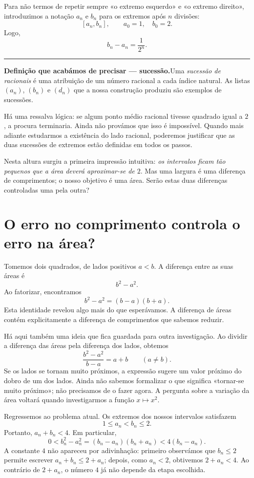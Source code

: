 \documentclass[11pt,a4paper]{article}
\newcommand{\assentado}[2]{%
\par\medskip\noindent\begingroup\color{azul}\rule{\linewidth}{0.45pt}\par\smallskip
\noindent\textbf{#1.}\enspace #2\par\endgroup\medskip}
\begin{document}
Para não termos de repetir sempre «o extremo esquerdo» e «o extremo direito», introduzimos a notação $a_n$ e $b_n$ para os extremos após $n$ divisões:
\[
[a_n,b_n],\qquad a_0=1,\quad b_0=2.
\]
Logo,
\[
\boxed{b_n-a_n=\frac1{2^n}.}
\]

\assentado{Definição que acabámos de precisar --- sucessão}{Uma \emph{sucessão de racionais} é uma atribuição de um número racional a cada índice natural. As listas $(a_n)$, $(b_n)$ e $(d_n)$ que a nossa construção produziu são exemplos de sucessões.}

Há uma ressalva lógica: se algum ponto médio racional tivesse quadrado igual a $2$, a procura terminaria. Ainda não provámos que isso é impossível. Quando mais adiante estudarmos a existência do lado racional, poderemos justificar que as duas sucessões de extremos estão definidas em todos os passos.

Nesta altura surgiu a primeira impressão intuitiva: \emph{os intervalos ficam tão pequenos que a área deverá aproximar-se de $2$}. Mas uma largura é uma diferença de comprimentos; o nosso objetivo é uma área. Serão estas duas diferenças controladas uma pela outra?

\section{O erro no comprimento controla o erro na área?}

Tomemos dois quadrados, de lados positivos $a<b$. A diferença entre as suas áreas é
\[
b^2-a^2.
\]
Ao fatorizar, encontramos
\[
\boxed{b^2-a^2=(b-a)(b+a).}
\]
Esta identidade revelou algo mais do que esperávamos. A diferença de áreas contém explicitamente a diferença de comprimentos que sabemos reduzir.

Há aqui também uma ideia que fica guardada para outra investigação. Ao dividir a diferença das áreas pela diferença dos lados, obtemos
\[
\frac{b^2-a^2}{b-a}=a+b\qquad(a\ne b).
\]
Se os lados se tornam muito próximos, a expressão sugere um valor próximo do dobro de um dos lados. Ainda não sabemos formalizar o que significa «tornar-se muito próximo»; não precisamos de o fazer agora. A pergunta sobre a variação da área voltará quando investigarmos a função $x\mapsto x^2$.

Regressemos ao problema atual. Os extremos dos nossos intervalos satisfazem
\[
1\le a_n<b_n\le2.
\]
Portanto, $a_n+b_n<4$. Em particular,
\[
0<b_n^2-a_n^2=(b_n-a_n)(b_n+a_n)<4(b_n-a_n).
\]
A constante $4$ não apareceu por adivinhação: primeiro observámos que $b_n\le2$ permite escrever $a_n+b_n\le2+a_n$; depois, como $a_n<2$, obtivemos $2+a_n<4$. Ao contrário de $2+a_n$, o número $4$ já não depende da etapa escolhida.
\end{document}
